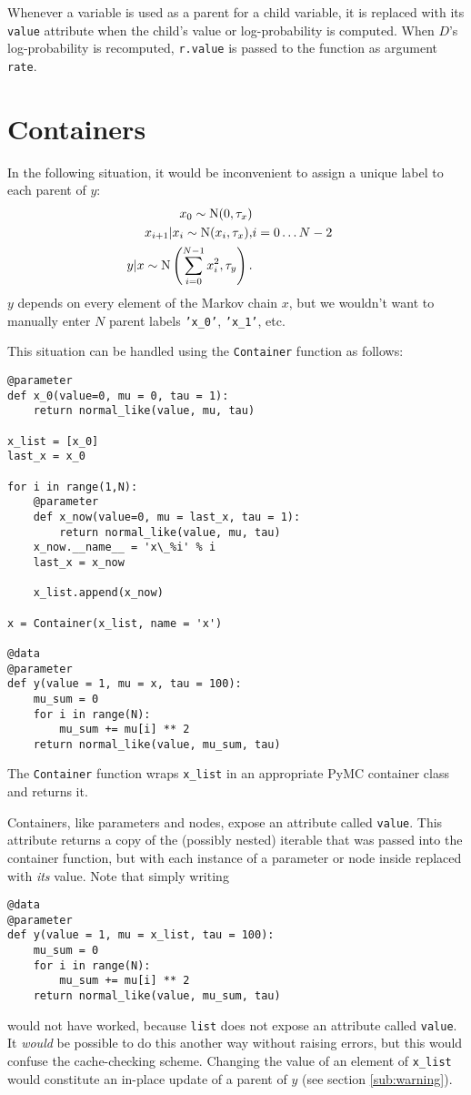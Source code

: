 Whenever a variable is used as a parent for a child variable, it is replaced with its \texttt{value} attribute when the child's value or log-probability is computed. When $D$'s log-probability is recomputed, \texttt{r.value} is passed to the function as argument \texttt{rate}. 

\section{Containers}\label{sub:container}
In the following situation, it would be inconvenient to assign a unique label to each parent of $y$:
\begin{eqnarray*}
    x_0 \sim \textup N(0,\tau_x)\\
    x_{i+1}|x_i\sim\textup{N}(x_i, \tau_x),& i=0\ldots N-2\\
    y|x \sim \textup N\left(\sum_{i=0}^{N-1}x_i^2,\tau_y\right).
\end{eqnarray*}
$y$ depends on every element of the Markov chain $x$, but we wouldn't want to manually enter $N$ parent labels \texttt{'x_0'}, \texttt{'x\_1'}, etc.

This situation can be handled using the \texttt{Container} function as follows:
\begin{verbatim}
@parameter
def x_0(value=0, mu = 0, tau = 1):
    return normal_like(value, mu, tau)

x_list = [x_0]
last_x = x_0

for i in range(1,N):          
    @parameter
    def x_now(value=0, mu = last_x, tau = 1):
        return normal_like(value, mu, tau)
    x_now.__name__ = 'x\_%i' % i
    last_x = x_now
    
    x_list.append(x_now)
        
x = Container(x_list, name = 'x')

@data
@parameter
def y(value = 1, mu = x, tau = 100):
    mu_sum = 0
    for i in range(N):
        mu_sum += mu[i] ** 2
    return normal_like(value, mu_sum, tau)
\end{verbatim}
The \texttt{Container} function wraps \texttt{x\_list} in an appropriate PyMC container class and returns it.

Containers, like parameters and nodes, expose an attribute called \texttt{value}. This attribute returns a copy of the (possibly nested) iterable that was passed into the container function, but with each instance of a parameter or node inside replaced with \emph{its} value. Note that simply writing
\begin{verbatim}
@data
@parameter
def y(value = 1, mu = x_list, tau = 100):
    mu_sum = 0
    for i in range(N):
        mu_sum += mu[i] ** 2
    return normal_like(value, mu_sum, tau)
\end{verbatim}
would not have worked, because \texttt{list} does not expose an attribute called \texttt{value}. It \emph{would} be possible to do this another way without raising errors, but this would confuse the cache-checking scheme. Changing the value of an element of \texttt{x\_list} would constitute an in-place update of a parent of $y$ (see section \ref{sub:warning}).

